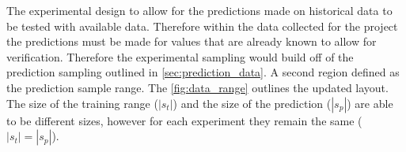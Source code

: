 




The experimental design to allow for the predictions made on historical data to be tested with available data. Therefore within the data collected for the project the predictions must be made for values that are already known to allow for verification. Therefore the experimental sampling would build off of the prediction sampling outlined in \autoref{sec:prediction_data}. A second region defined as the prediction sample range. The \autoref{fig:data_range} outlines the updated layout. The size of the training range ($|s_t|$) and the size of the prediction ($|s_p|$) are able to be different sizes, however for each experiment they remain the same ($|s_t| = |s_p|$).





